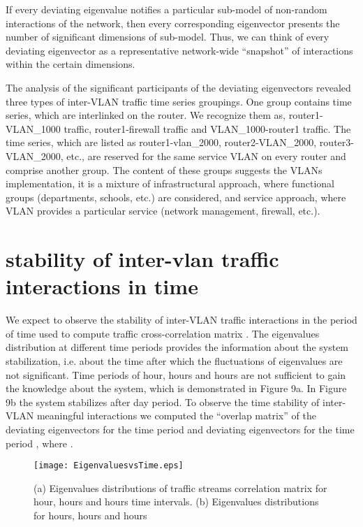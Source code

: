 \documentclass{IEEEtran}
\begin{document}
If every deviating eigenvalue notifies a particular sub-model of non-random
interactions of the network, then every corresponding eigenvector
presents the number of significant dimensions of sub-model. Thus,
we can think of every deviating eigenvector as a representative network-wide
{}``snapshot'' of interactions within the certain dimensions. 

The analysis of the significant participants of the deviating eigenvectors
revealed three types of inter-VLAN traffic time series groupings.
One group contains time series, which are interlinked on the router.
We recognize them as, router1-VLAN\_1000 traffic, router1-firewall
traffic and VLAN\_1000-router1 traffic. The time series, which are
listed as router1-vlan\_2000, router2-VLAN\_2000, router3-VLAN\_2000,
etc., are reserved for the same service VLAN on every router and comprise
another group. The content of these groups suggests the VLANs implementation,
it is a mixture of infrastructural approach, where functional groups
(departments, schools, etc.) are considered, and service approach,
where VLAN provides a particular service (network management, firewall,
etc.). 


\section{stability of inter-vlan traffic interactions in time}

We expect to observe the stability of inter-VLAN traffic interactions
in the period of time used to compute traffic cross-correlation matrix
. The eigenvalues distribution at different time periods provides
the information about the system stabilization, i.e. about the time
after which the fluctuations of eigenvalues are not significant. Time
periods of  hour,  hours and  hours are not sufficient
to gain the knowledge about the system, which is demonstrated in Figure
9a. In Figure 9b the system stabilizes after  day period. To observe
the time stability of inter-VLAN meaningful interactions we computed
the {}``overlap matrix'' of the deviating eigenvectors for the time
period  and deviating eigenvectors for the time period ,
where .\begin{figure}[h]
\begin{center}\texttt{[image: EigenvaluesvsTime.eps]}\end{center}


\caption{\label{9} (a) Eigenvalues distributions of traffic streams correlation
matrix  for  hour,  hours and  hours time intervals.
(b) Eigenvalues distributions for  hours,  hours and 
hours}
\end{figure}
\end{document}
